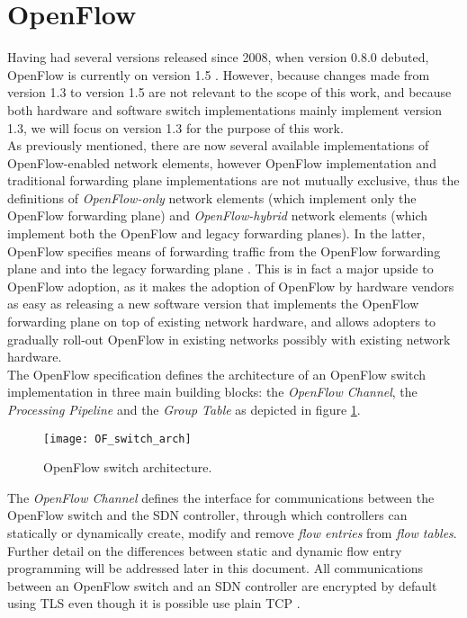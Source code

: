 \section{OpenFlow}
\label{section:openflow}
Having had several versions released since 2008, when version 0.8.0 debuted, OpenFlow is currently on version 1.5 \cite{OF15}.
However, because changes made from version 1.3 to version 1.5 \cite{OF15}\cite{OF13} are not relevant to the scope of this work, and because both hardware and software switch implementations mainly implement version 1.3, we will focus on version 1.3 for the purpose of this work.\\
%
As previously mentioned, there are now several available implementations of OpenFlow-enabled network elements, however OpenFlow implementation and traditional forwarding plane implementations are not mutually exclusive, thus the definitions of \emph{OpenFlow-only} network elements (which implement only the OpenFlow forwarding plane) and \emph{OpenFlow-hybrid} network elements (which implement both the OpenFlow and legacy forwarding planes).
In the latter, OpenFlow specifies means of forwarding traffic from the OpenFlow forwarding plane and into the legacy forwarding plane \cite{OF13}.
This is in fact a major upside to OpenFlow adoption, as it makes the adoption of OpenFlow by hardware vendors as easy as releasing a new software version that implements the OpenFlow forwarding plane on top of existing network hardware, and allows adopters to gradually roll-out OpenFlow in existing networks possibly with existing network hardware.\\
%
The OpenFlow specification defines the architecture of an OpenFlow switch implementation in three main building blocks: the \emph{OpenFlow Channel}, the \emph{Processing Pipeline} and the \emph{Group Table} as depicted in figure \ref{fig:OF_switch_arch}.
\begin{figure}
	\centering
	\texttt{[image: OF\_switch\_arch]}
	\caption{OpenFlow switch architecture.}
	\label{fig:OF_switch_arch}
\end{figure}
The \emph{OpenFlow Channel} defines the interface for communications between the OpenFlow switch and the \gls{SDN} controller, through which controllers can statically or dynamically create, modify and remove \emph{flow entries} from \emph{flow tables}.
Further detail on the differences between static and dynamic flow entry programming will be addressed later in this document.
All communications between an OpenFlow switch and an \gls{SDN} controller are encrypted by default using \gls{TLS} even though it is possible use plain \gls{TCP} \cite{OF13}.
